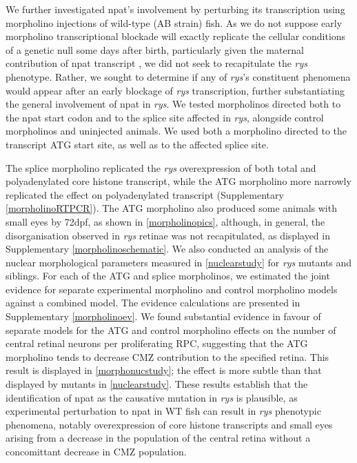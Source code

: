 We further investigated npat's involvement by perturbing its transcription using morpholino injections of wild-type (AB strain) fish. As we do not suppose early morpholino transcriptional blockade will exactly replicate the cellular conditions of a genetic null some days after birth, particularly given the maternal contribution of npat transcript \cite{Harvey2013}, we did not seek to recapitulate the \textit{rys} phenotype. Rather, we sought to determine if any of \textit{rys}'s constituent phenomena would appear after an early blockage of \textit{rys} transcription, further substantiating the general involvement of npat in \textit{rys}. We tested morpholinos directed both to the npat start codon and to the splice site affected in \textit{rys}, alongside control morpholinos and uninjected animals. We used both a morpholino directed to the transcript ATG start site, as well as to the affected splice site. 

The splice morpholino replicated the \textit{rys} overexpression of both total and polyadenylated core histone transcript, while the ATG morpholino more narrowly replicated the effect on polyadenylated transcript (Supplementary \autoref{morpholinoRTPCR}). The ATG morpholino also produced some animals with small eyes by 72dpf, as shown in \autoref{morpholinopics}, although, in general, the disorganisation observed in \textit{rys} retinae was not recapitulated, as displayed in Supplementary \autoref{morpholinoschematic}. We also conducted an analysis of the nuclear morphological parameters measured in \autoref{nuclearstudy} for \textit{rys} mutants and siblings. For each of the ATG and splice morpholinos, we estimated the joint evidence for separate experimental morpholino and control morpholino models against a combined model. The evidence calculations are presented in Supplementary \autoref{morpholinoev}. We found substantial evidence in favour of separate models for the ATG and control morpholino effects on the number of central retinal neurons per proliferating RPC, suggesting that the ATG morpholino tends to decrease CMZ contribution to the specified retina. This result is displayed in \autoref{morphonucstudy}; the effect is more subtle than that displayed by mutants in \autoref{nuclearstudy}. These results establish that the identification of npat as the causative mutation in \textit{rys} is plausible, as experimental perturbation to npat in WT fish can result in \textit{rys} phenotypic phenomena, notably overexpression of core histone transcripts and small eyes arising from a decrease in the population of the central retina without a concomittant decrease in CMZ population. 

